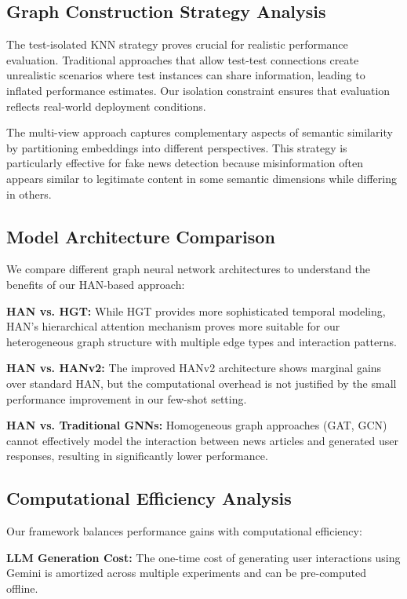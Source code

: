 \subsection{Graph Construction Strategy Analysis}

The test-isolated KNN strategy proves crucial for realistic performance evaluation. Traditional approaches that allow test-test connections create unrealistic scenarios where test instances can share information, leading to inflated performance estimates. Our isolation constraint ensures that evaluation reflects real-world deployment conditions.

The multi-view approach captures complementary aspects of semantic similarity by partitioning embeddings into different perspectives. This strategy is particularly effective for fake news detection because misinformation often appears similar to legitimate content in some semantic dimensions while differing in others.

\subsection{Model Architecture Comparison}

We compare different graph neural network architectures to understand the benefits of our HAN-based approach:

\textbf{HAN vs. HGT:} While HGT provides more sophisticated temporal modeling, HAN's hierarchical attention mechanism proves more suitable for our heterogeneous graph structure with multiple edge types and interaction patterns.

\textbf{HAN vs. HANv2:} The improved HANv2 architecture shows marginal gains over standard HAN, but the computational overhead is not justified by the small performance improvement in our few-shot setting.

\textbf{HAN vs. Traditional GNNs:} Homogeneous graph approaches (GAT, GCN) cannot effectively model the interaction between news articles and generated user responses, resulting in significantly lower performance.

\subsection{Computational Efficiency Analysis}

Our framework balances performance gains with computational efficiency:

\textbf{LLM Generation Cost:} The one-time cost of generating user interactions using Gemini is amortized across multiple experiments and can be pre-computed offline.

